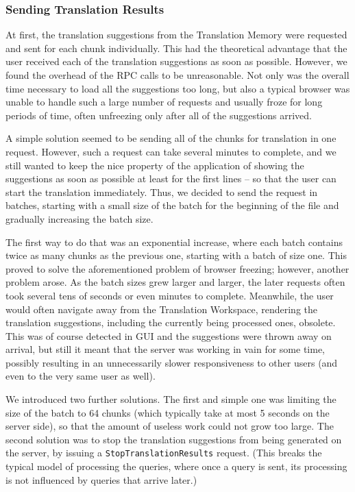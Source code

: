 {\subsubsection{Sending Translation Results}

At first, the translation suggestions from the Translation Memory were requested and sent for each chunk individually. This had the theoretical advantage that the user received each of the translation suggestions as soon as possible. However, we found the overhead of the RPC calls to be unreasonable. Not only was the overall time necessary to load all the suggestions too long, but also a typical browser was unable to handle such a large number of requests and usually froze for long periods of time, often unfreezing only after all of the suggestions arrived.

A simple solution seemed to be sending all of the chunks for translation in one request. However, such a request can take several minutes to complete, and we still wanted to keep the nice property of the application of showing the suggestions as soon as possible at least for the first lines -- so that the user can start the translation immediately. Thus, we decided to send the request in batches, starting with a small size of the batch for the beginning of the file and gradually increasing the batch size.

The first way to do that was an exponential increase, where each batch contains twice as many chunks as the previous one, starting with a batch of size one. This proved to solve the aforementioned problem of browser freezing; however, another problem arose. As the batch sizes grew larger and larger, the later requests often took several tens of seconds or even minutes to complete. Meanwhile, the user would often navigate away from the Translation Workspace, rendering the translation suggestions, including the currently being processed ones, obsolete. This was of course detected in GUI and the suggestions were thrown away on arrival, but still it meant that the server was working in vain for some time, possibly resulting in an unnecessarily slower responsiveness to other users (and even to the very same user as well).

We introduced two further solutions. The first and simple one was limiting the size of the batch to 64 chunks (which typically take at most 5 seconds on the server side), so that the amount of useless work could not grow too large. The second solution was to stop the translation suggestions from being generated on the server, by issuing a {\tt StopTranslationResults} request. (This breaks the typical model of processing the queries, where once a query is sent, its processing is not influenced by queries that arrive later.)

}
